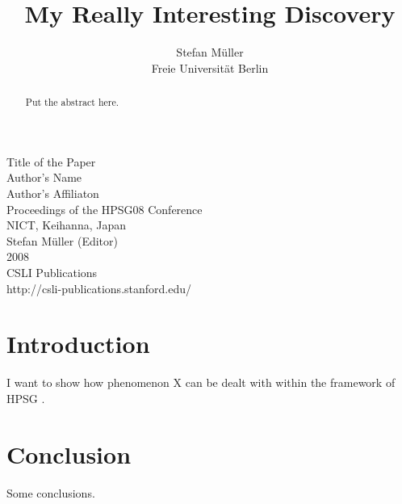 \documentclass[11pt,a4paper,fleqn,draft]{article}
\title{My Really Interesting Discovery}
\author{Stefan M{\"u}ller\\
Freie Universit{\"a}t Berlin}
\begin{document}

\begin{center}
\Large
Title of the Paper\\[\baselineskip]

Author's Name\\[\baselineskip]
Author's Affiliaton\\[3\baselineskip]

                Proceedings of the HPSG08 Conference\\[\baselineskip]

                       NICT, Keihanna, Japan\\[\baselineskip]

                        Stefan M{\"u}ller (Editor)\\[\baselineskip]

                                2008\\[\baselineskip]

                          CSLI Publications\\[\baselineskip]

              http://csli-publications.stanford.edu/

\end{center}

\newpage

\begin{abstract}
Put the abstract here.
\end{abstract}

\setcounter{footnote}{2}
\renewcommand{\thefootnote}{\fnsymbol{footnote}}
\renewcommand{\thefootnote}{\arabic{footnote}}
\setcounter{footnote}{0}


\section{Introduction}

I want to show how phenomenon X can be dealt with within the framework of HPSG
\citep{PS87a,PS94a}.

\section{Conclusion}

Some conclusions.



 

\end{document}
